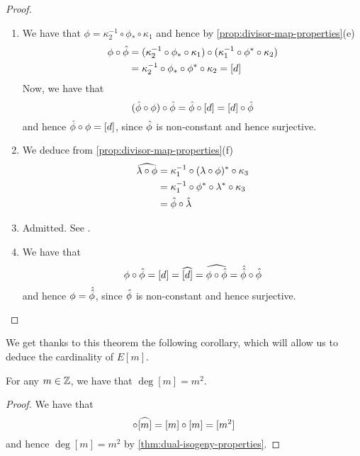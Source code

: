 \begin{proof}
	\begin{enumerate}[label=(\alph*), itemsep=0em]
		\item We have that $\phi = \kappa_2^{-1}\circ\phi_*\circ\kappa_1$
			and hence by \ref{prop:divisor-map-properties}(e)
			\begin{align*}
				\phi\circ\Hat\phi &=(\kappa_2^{-1}\circ\phi_*\circ
				\kappa_1)\circ(\kappa_1^{-1}\circ\phi^*\circ\kappa_2)\\
				&=\kappa_2^{-1}\circ \phi_*\circ\phi^*\circ \kappa_2 = [d]
			\end{align*}
			Now, we have that
			\begin{equation*}
				(\Hat\phi\circ\phi)\circ\Hat\phi = 
				\Hat\phi\circ[d] = [d]\circ\Hat\phi
			\end{equation*}
			and hence $\Hat\phi\circ\phi = [d]$, since $\Hat\phi$ is
			non-constant and hence surjective.
		\item We deduce from \ref{prop:divisor-map-properties}(f)
			\begin{align*}
				\widehat{\lambda\circ\phi} &= 
				\kappa_1^{-1}\circ(\lambda\circ\phi)^*\circ\kappa_3\\
				&= \kappa_1^{-1}\circ\phi^*\circ\lambda^*\circ\kappa_3\\
				&= \Hat\phi\circ\Hat\lambda
			\end{align*}
		\item Admitted. See \cite[III.6.2(d)]{silverman}.
		\item We have that
			\begin{equation*}
				\phi\circ\Hat\phi = [d] = \widehat{[d]}
				= \widehat{\phi\circ\Hat\phi} = 
				\Hat{\Hat\phi} \circ\Hat\phi
			\end{equation*}
			and hence $\phi = \Hat{\Hat\phi}$, since $\Hat\phi$
			is non-constant and hence surjective.
		\end{enumerate}	
\end{proof}

We get thanks to this theorem the following corollary, which will allow us
to deduce the cardinality of $E[m]$.

\begin{corollary}
	For any $m \in \mathbb{Z}$, we have that $\deg[m] = m^2$.
\end{corollary}

\begin{proof}
	We have that
	\begin{equation*}
		[m]\circ\ddual{[m]} = [m]\circ[m] = [m^2]
	\end{equation*}
	and hence $\deg[m] = m^2$ by \ref{thm:dual-isogeny-properties}.
\end{proof}

